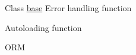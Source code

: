 \label{todo__todo000001}
\hypertarget{todo__todo000001}{}
 
\begin{DoxyDescription}
\item[Class \hyperlink{classbase}{base} ]Error handling function 

Autoloading function 

ORM 
\end{DoxyDescription}